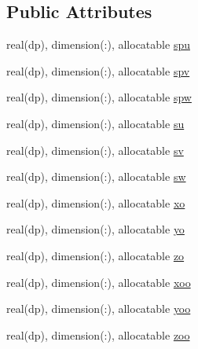 \subsection*{Public Attributes}
\begin{DoxyCompactItemize}
\item 
real(dp), dimension(\-:), allocatable \hyperlink{structfv__equation_1_1fvvectorequation_a7f44e6ac5ffa1baa495dd13137ef8be7}{spu}
\item 
real(dp), dimension(\-:), allocatable \hyperlink{structfv__equation_1_1fvvectorequation_a33b72db8fdfb8122c72fe2e5a9593eb1}{spv}
\item 
real(dp), dimension(\-:), allocatable \hyperlink{structfv__equation_1_1fvvectorequation_aa15bb4a30555344af9fdb0817b411544}{spw}
\item 
real(dp), dimension(\-:), allocatable \hyperlink{structfv__equation_1_1fvvectorequation_ad955a3b8ed3260f8f97d94515f95a9b5}{su}
\item 
real(dp), dimension(\-:), allocatable \hyperlink{structfv__equation_1_1fvvectorequation_ab1cbe6f0b271700792f9b854acbf5174}{sv}
\item 
real(dp), dimension(\-:), allocatable \hyperlink{structfv__equation_1_1fvvectorequation_a35835e2b67a385850608de4a6cd0456c}{sw}
\item 
real(dp), dimension(\-:), allocatable \hyperlink{structfv__equation_1_1fvvectorequation_aa8f4bd07b31af4434d8e33dc06b402e5}{xo}
\item 
real(dp), dimension(\-:), allocatable \hyperlink{structfv__equation_1_1fvvectorequation_ac2446def37d90a8809b2c3998de30c8e}{yo}
\item 
real(dp), dimension(\-:), allocatable \hyperlink{structfv__equation_1_1fvvectorequation_a6722be7e3093855814a40ce85ec58508}{zo}
\item 
real(dp), dimension(\-:), allocatable \hyperlink{structfv__equation_1_1fvvectorequation_ac4a216c8f3ffa2d167b6b0cab25801ef}{xoo}
\item 
real(dp), dimension(\-:), allocatable \hyperlink{structfv__equation_1_1fvvectorequation_a1631b0c62d09b603309dfa754a31a7fd}{yoo}
\item 
real(dp), dimension(\-:), allocatable \hyperlink{structfv__equation_1_1fvvectorequation_a890fa380a32227ef9e1b33590357076c}{zoo}
\end{DoxyCompactItemize}


